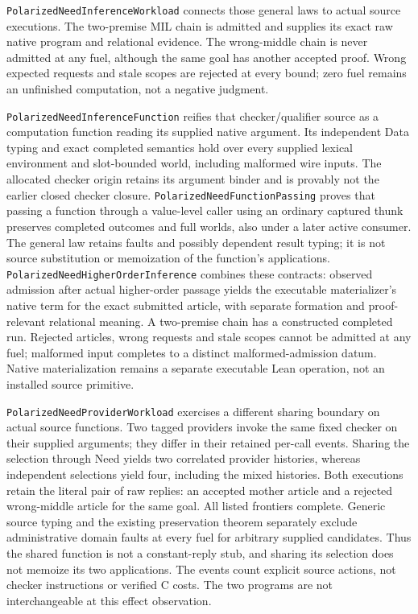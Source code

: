 \documentclass[11pt]{article}
\theoremstyle{definition}
\theoremstyle{remark}
\begin{document}
\nolinkurl{PolarizedNeedInferenceWorkload} connects those general laws to
actual source executions. The two-premise MIL chain is admitted and supplies
its exact raw native program and relational evidence. The wrong-middle chain
is never admitted at any fuel, although the same goal has another accepted
proof. Wrong expected requests and stale scopes are rejected at every bound;
zero fuel remains an unfinished computation, not a negative judgment.

\nolinkurl{PolarizedNeedInferenceFunction} reifies that checker/qualifier
source as a computation function reading its supplied native argument.
Its independent Data typing and exact completed semantics hold over every
supplied lexical environment and slot-bounded world, including malformed
wire inputs. The allocated checker origin retains its argument binder and
is provably not the earlier closed checker closure.
\nolinkurl{PolarizedNeedFunctionPassing} proves that passing a function
through a value-level caller using an ordinary captured thunk preserves
completed outcomes and full worlds, also under a later active consumer.
The general law retains faults and possibly dependent result typing;
it is not source substitution or memoization of the function's applications.
\nolinkurl{PolarizedNeedHigherOrderInference} combines these contracts:
observed admission after actual higher-order passage yields the executable
materializer's native term for the exact submitted article, with separate
formation and proof-relevant relational meaning. A two-premise chain has
a constructed completed run. Rejected articles, wrong requests and stale
scopes cannot be admitted at any fuel; malformed input completes to a
distinct malformed-admission datum. Native materialization remains a
separate executable Lean operation, not an installed source primitive.

\nolinkurl{PolarizedNeedProviderWorkload} exercises a different sharing
boundary on actual source functions. Two tagged providers invoke the same
fixed checker on their supplied arguments; they differ in their retained
per-call events. Sharing the selection through Need yields two correlated
provider histories, whereas independent selections yield four, including
the mixed histories. Both executions retain the literal pair of raw replies:
an accepted mother article and a rejected wrong-middle article for the same
goal. All listed frontiers complete. Generic source typing and the existing
preservation theorem separately exclude administrative domain faults at
every fuel for arbitrary supplied candidates. Thus the shared function is
not a constant-reply stub, and sharing its selection does not memoize its
two applications. The events count explicit source actions, not checker
instructions or verified C costs. The two programs are not interchangeable
at this effect observation.
\end{document}
